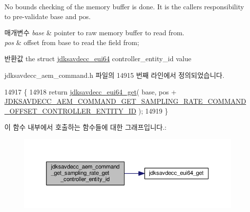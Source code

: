 No bounds checking of the memory buffer is done. It is the caller\textquotesingle{}s responsibility to pre-\/validate base and pos.


\begin{DoxyParams}{매개변수}
{\em base} & pointer to raw memory buffer to read from. \\
\hline
{\em pos} & offset from base to read the field from; \\
\hline
\end{DoxyParams}
\begin{DoxyReturn}{반환값}
the struct \hyperlink{structjdksavdecc__eui64}{jdksavdecc\+\_\+eui64} controller\+\_\+entity\+\_\+id value 
\end{DoxyReturn}


jdksavdecc\+\_\+aem\+\_\+command.\+h 파일의 14915 번째 라인에서 정의되었습니다.


\begin{DoxyCode}
14917 \{
14918     \textcolor{keywordflow}{return} \hyperlink{group__eui64_ga2652311a25a6b91cddbed75c108c7031}{jdksavdecc\_eui64\_get}( base, pos + 
      \hyperlink{group__command__get__sampling__rate_ga2a0f7ce5c6667fd5267a38e747afa44e}{JDKSAVDECC\_AEM\_COMMAND\_GET\_SAMPLING\_RATE\_COMMAND\_OFFSET\_CONTROLLER\_ENTITY\_ID}
       );
14919 \}
\end{DoxyCode}


이 함수 내부에서 호출하는 함수들에 대한 그래프입니다.\+:
\nopagebreak
\begin{figure}[H]
\begin{center}
\leavevmode
\includegraphics[width=350pt]{group__command__get__sampling__rate_ga5028018668b2880bd4ce272e63ed3672_cgraph}
\end{center}
\end{figure}


